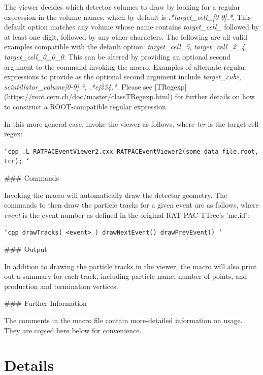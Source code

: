 \documentclass[a4paper]{article}
\providecommand*{\DUroletitlereference}[1]{\textsl{#1}}
\begin{document}
The viewer decides which detector volumes to draw by looking for a regular expression in the volume names, which by default is \DUroletitlereference{.*target\_cell\_{[}0-9{]}.*}.
This default option matches any volume whose name contains \DUroletitlereference{target\_cell\_} followed by at least one digit, followed by any other characters.
The following are all valid examples compatible with the default option: \DUroletitlereference{target\_cell\_5}, \DUroletitlereference{target\_cell\_2\_4}, \DUroletitlereference{target\_cell\_0\_0\_0}.
This can be altered by providing an optional second argument to the command invoking the macro.
Examples of alternate regular expressions to provide as the optional second argument include \DUroletitlereference{target\_cube}, \DUroletitlereference{scintillator\_volume{[}0-9{]}.?}, \DUroletitlereference{.*ej254.*}.
Please see {[}TRegexp{]}(\url{https://root.cern.ch/doc/master/classTRegexp.html}) for further details on how to construct a ROOT-compatible regular expression.

In this more general case, invoke the viewer as follows, where \DUroletitlereference{tcr} is the target-cell regex:

\texttt{`cpp
.L RATPACEventViewer2.cxx
RATPACEventViewer2(\textquotedbl{}some\_data\_file.root\textquotedbl{}, \textquotedbl{}tcr\textquotedbl{});
`}

\#\#\# Commands

Invoking the macro will automatically draw the detector geometry. The commands to then draw the particle tracks for a given event are as follows, where \DUroletitlereference{event} is the event number as defined in the original RAT-PAC TTree's 'mc.id':

\texttt{`cpp
drawTracks( <event> )
drawNextEvent()
drawPrevEvent()
`}

\#\#\# Output

In addition to drawing the particle tracks in the viewer, the macro will also print out a summary for each track, including particle name, number of points, and production and termination vertices.

\#\#\# Further Information

The comments in the macro file contain more-detailed information on usage. They are copied here below for convenience.


\section{Details%
  \label{details}%
}
\end{document}
